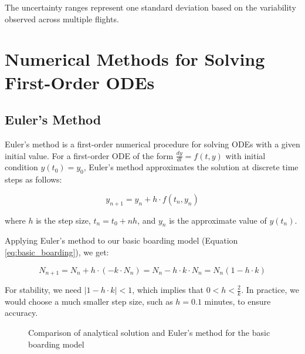 \documentclass[12pt,a4paper]{article}
\begin{document}
The uncertainty ranges represent one standard deviation based on the variability observed across multiple flights.

\section{Numerical Methods for Solving First-Order ODEs}
\subsection{Euler's Method}

Euler's method is a first-order numerical procedure for solving ODEs with a given initial value. For a first-order ODE of the form $\frac{dy}{dt} = f(t, y)$ with initial condition $y(t_0) = y_0$, Euler's method approximates the solution at discrete time steps as follows:

\begin{equation}
y_{n+1} = y_n + h \cdot f(t_n, y_n)
\label{eq:euler}
\end{equation}

where $h$ is the step size, $t_n = t_0 + nh$, and $y_n$ is the approximate value of $y(t_n)$.

Applying Euler's method to our basic boarding model (Equation \ref{eq:basic_boarding}), we get:

\begin{equation}
N_{n+1} = N_n + h \cdot (-k \cdot N_n) = N_n - h \cdot k \cdot N_n = N_n (1 - h \cdot k)
\label{eq:euler_boarding}
\end{equation}

For stability, we need $|1 - h \cdot k| < 1$, which implies that $0 < h < \frac{2}{k}$. In practice, we would choose a much smaller step size, such as $h = 0.1$ minutes, to ensure accuracy.

\begin{figure}[H]
\centering
{}
\caption{Comparison of analytical solution and Euler's method for the basic boarding model}
\label{fig:euler_comparison}
\end{figure}
\end{document}
